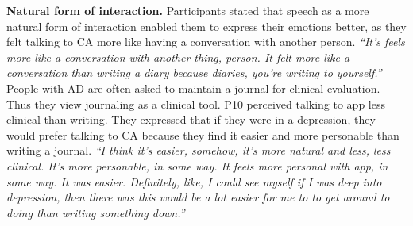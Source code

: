         
        
        
        
        
        \textbf{Natural form of interaction. }
        Participants stated that speech as a more natural form of interaction enabled them to express their emotions better, as they felt talking to \ac{CA} more like having a conversation with another person.
                \textit{
                ``It's feels more like a conversation with another thing, person. It felt more like a conversation than writing a diary because diaries, you're writing to yourself.''
                }
        People with \ac{AD} are often asked to maintain a journal for clinical evaluation. Thus they view journaling as a clinical tool. 
        P10 perceived talking to \acl{app} less clinical than writing. They expressed that if they were in a depression, they would prefer talking to \ac{CA} because they find it easier and more personable than writing a journal.
                \textit{``I think it's easier, somehow, it's more natural and less, less clinical. It's more personable, in some way.
                It feels more personal with \acl{app}, in some way. It was easier. Definitely, like, I could see myself if I was deep into depression, then there was this would be a lot easier for me to to get around to doing than writing something down.''}
